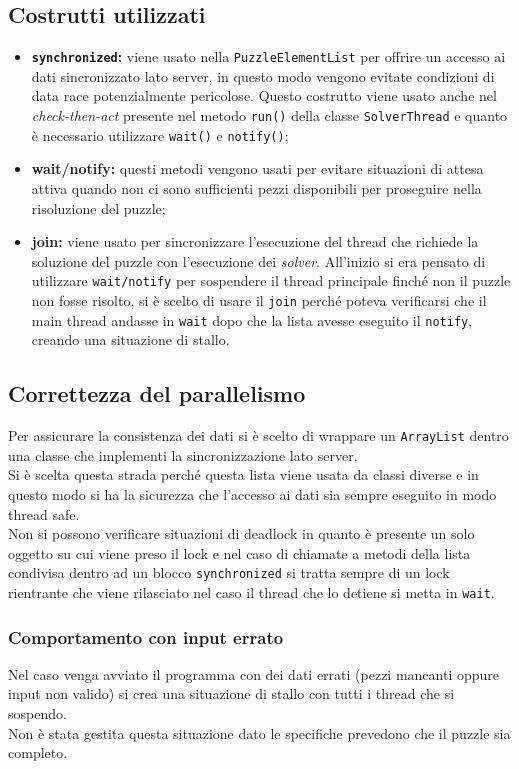 \documentclass[a4paper, 11pt]{article}
\newcommand{\sync}{\texttt{synchronized}\xspace}
\begin{document}
\subsection{Costrutti utilizzati}
\begin{itemize}
\item \textbf{\sync:} viene usato nella \texttt{PuzzleElementList}  per offrire un accesso ai dati sincronizzato lato server, in questo modo vengono evitate condizioni di data race potenzialmente pericolose. Questo costrutto viene usato anche nel \textit{check-then-act} presente nel metodo \texttt{run()} della classe \texttt{SolverThread} e quanto è necessario utilizzare \texttt{wait()} e \texttt{notify()};
\item \textbf{wait/notify:} questi metodi vengono usati per evitare situazioni di attesa attiva quando non ci sono sufficienti pezzi disponibili per proseguire nella risoluzione del puzzle;
\item \textbf{join:} viene usato per sincronizzare l'esecuzione del thread che richiede la soluzione del puzzle con l'esecuzione dei \textit{solver}. All'inizio si era pensato di utilizzare \texttt{wait/notify} per sospendere il thread principale finché non il puzzle non fosse risolto, si è scelto di usare il \texttt{join} perché poteva verificarsi che il main thread andasse in \texttt{wait} dopo che la lista avesse eseguito il \texttt{notify}, creando una situazione di stallo.
\end{itemize}

\subsection{Correttezza del parallelismo}
Per assicurare la consistenza dei dati si è scelto di wrappare un \texttt{ArrayList} dentro una classe che implementi la sincronizzazione lato server. \\
Si è scelta questa strada perché questa lista viene usata da classi diverse e in questo modo si ha la sicurezza che l'accesso ai dati sia sempre eseguito in modo thread safe.
\\
Non si possono verificare situazioni di deadlock in quanto è presente un solo oggetto su cui viene preso il lock e nel caso di chiamate a metodi della lista condivisa dentro ad un blocco \sync si tratta sempre di un lock rientrante che viene rilasciato nel caso il thread che lo detiene si metta in \texttt{wait}.

\subsubsection{Comportamento con input errato}\label{inputErrati}
Nel caso venga avviato il programma con dei dati errati (pezzi mancanti oppure input non valido) si crea una situazione di stallo con tutti i thread che si sospendo. \\
Non è stata gestita questa situazione dato le specifiche prevedono che il puzzle sia completo.
\end{document}
